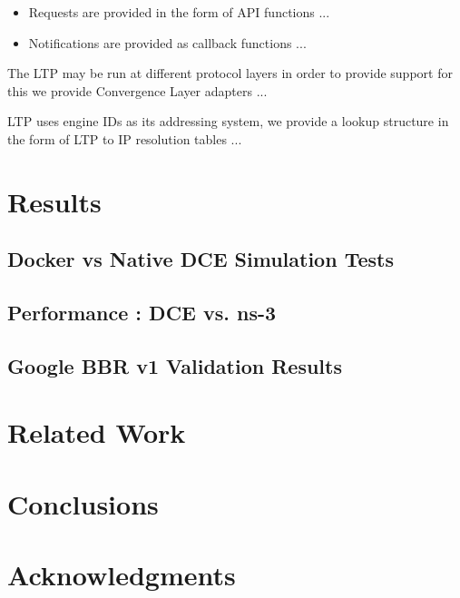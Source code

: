 \documentclass{sig-alternate}
\begin{document}
\begin{itemize}
 \item Requests are provided in the form of API functions ...
 \item Notifications are provided as callback functions ...
\end{itemize}

The LTP may be run at different protocol layers in order to provide support for this
we provide Convergence Layer adapters ...

LTP uses engine IDs as its addressing system, we provide a lookup structure in the form of LTP to IP resolution tables ...


\section{Results}

\subsection{Docker vs Native DCE Simulation Tests}

\subsection{Performance : DCE vs. ns-3}

\subsection{Google BBR v1 Validation Results}

\section{Related Work}

\section{Conclusions}

\section{Acknowledgments}
%

%
%
\end{document}
